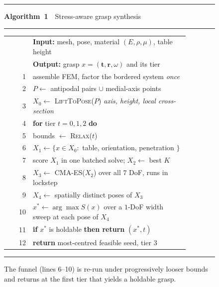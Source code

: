 \begin{figure}[t]
\hrule\vspace{3pt}
\noindent\textbf{Algorithm~1}~~Stress-aware grasp synthesis
\vspace{2pt}\hrule\vspace{4pt}
\footnotesize
\noindent\begin{tabular}{@{}r@{~~}p{0.86\linewidth}@{}}
   & \textbf{Input:} mesh, pose, material $(E,\rho,\mu)$, table height \\
   & \textbf{Output:} grasp $x=(\mathbf{t},\mathbf{r},\omega)$ and its tier \\[2pt]
 1 & assemble FEM, factor the bordered system \emph{once} \\
 2 & $P \leftarrow$ antipodal pairs $\cup$ medial-axis points \\
 3 & $X_0 \leftarrow$ \textsc{LiftToPose}($P$) \hfill\emph{axis, height, local cross-section} \\[3pt]
 4 & \textbf{for} tier $t = 0,1,2$ \textbf{do} \\
 5 & \quad bounds $\leftarrow$ \textsc{Relax}($t$) \\
 6 & \quad $X_1 \leftarrow \{x \in X_0 :$ table, orientation, penetration $\}$ \\
 7 & \quad score $X_1$ in one batched solve; $X_2 \leftarrow$ best $K$ \\
 8 & \quad $X_3 \leftarrow$ \textsc{CMA-ES}($X_2$) over all $7$ DoF, runs in lockstep \\
 9 & \quad $X_4 \leftarrow$ spatially distinct poses of $X_3$ \\
10 & \quad $x^\ast \leftarrow \arg\max S(x)$ over a $1$-DoF width sweep at each pose of $X_4$ \\
11 & \quad \textbf{if} $x^\ast$ is holdable \textbf{then return} $(x^\ast, t)$ \\[3pt]
12 & \textbf{return} most-centred feasible seed, tier $3$ \\
\end{tabular}
\vspace{4pt}\hrule
\caption{The funnel (lines 6--10) is re-run under progressively looser bounds and returns at the
first tier that yields a holdable grasp.}
\label{alg:synth}
\end{figure}


